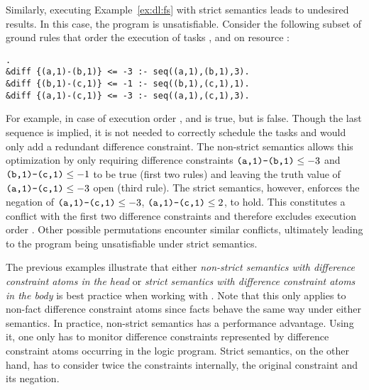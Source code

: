 \begin{example}
Similarly, executing Example~\ref{ex:dl:fs} with strict semantics leads to undesired results.
In this case, the program is unsatisfiable.
Consider the following subset of ground rules that order the execution of tasks ,  and  on resource :
\begin{lstlisting}[numbers=none].
&diff {(a,1)-(b,1)} <= -3 :- seq((a,1),(b,1),3).
&diff {(b,1)-(c,1)} <= -1 :- seq((b,1),(c,1),1).
&diff {(a,1)-(c,1)} <= -3 :- seq((a,1),(c,1),3).
\end{lstlisting}
For example, in case of execution order , 
 and  is true,
but  is false.
Though the last sequence is implied, it is not needed to correctly schedule the tasks and would only add a redundant difference constraint.
The non-strict semantics allows this optimization 
by only requiring difference constraints $\texttt{(a,1)-(b,1)}\leq -3$ and $\texttt{(b,1)-(c,1)}\leq -1$ to be true (first two rules)
and leaving the truth value of $\texttt{(a,1)-(c,1)}\leq -3$ open (third rule). 
The strict semantics, however, enforces the negation of $\texttt{(a,1)-(c,1)}\leq -3$, $\texttt{(a,1)-(c,1)}\leq 2$, to hold.
This constitutes a conflict with the first two difference constraints and therefore excludes execution order .
Other possible permutations encounter similar conflicts, ultimately leading to the program being unsatisfiable under strict semantics.
\end{example}

The previous examples illustrate that either \emph{non-strict semantics with difference constraint atoms in the head} or
\emph{strict semantics with difference constraint atoms in the body} is best practice when working with .
Note that this only applies to non-fact difference constraint atoms since facts behave the same way under either semantics.
In practice, non-strict semantics has a performance advantage.
Using it, one only has to monitor difference constraints represented by difference constraint atoms occurring in the logic program.
Strict semantics, on the other hand, has to consider twice the constraints internally, the original constraint and its negation.

